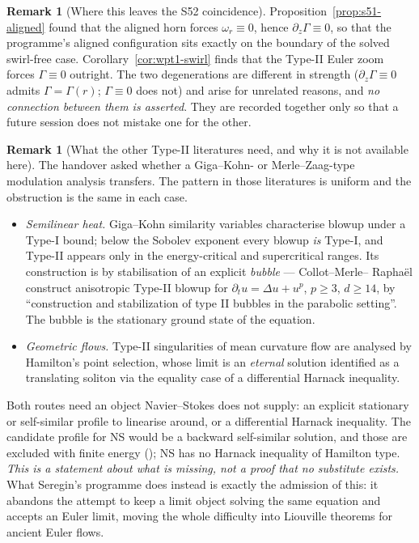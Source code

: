\documentclass[11pt]{article}
\theoremstyle{definition}
\newtheorem{remark}[theorem]{Remark}
\theoremstyle{remark}
\begin{document}
\begin{remark}[Where this leaves the S52 coincidence]
  \label{rem:wpt1-s52-coincidence}
  Proposition~\ref{prop:s51-aligned} found that the aligned horn forces
  $\omega_r\equiv0$, hence $\partial_z\Gamma\equiv0$, so that the programme's
  aligned configuration sits exactly on the boundary of the solved
  swirl-free case. Corollary~\ref{cor:wpt1-swirl} finds that the Type-II
  Euler zoom forces $\Gamma\equiv0$ outright. The two degenerations are
  different in strength ($\partial_z\Gamma\equiv0$ admits $\Gamma=\Gamma(r)$;
  $\Gamma\equiv0$ does not) and arise for unrelated reasons, and \emph{no
  connection between them is asserted}. They are recorded together only so
  that a future session does not mistake one for the other.
\end{remark}

\begin{remark}[What the other Type-II literatures need, and why it is not
  available here]\label{rem:wpt1-other-pdes}
  The handover asked whether a Giga--Kohn- or Merle--Zaag-type modulation
  analysis transfers. The pattern in those literatures is uniform and the
  obstruction is the same in each case.
  \begin{itemize}
    \item \emph{Semilinear heat.} Giga--Kohn similarity variables
      \cite{GigaKohn1987} characterise blowup under a Type-I bound; below the
      Sobolev exponent every blowup \emph{is} Type-I, and Type-II appears
      only in the energy-critical and supercritical ranges. Its construction
      is by stabilisation of an explicit \emph{bubble} --- Collot--Merle--%
      Rapha\"el \cite{CollotMerleRaphael2017} construct anisotropic Type-II
      blowup for $\partial_tu=\Delta u+u^p$, $p\geq3$, $d\geq14$, by
      ``construction and stabilization of type II bubbles in the parabolic
      setting''. The bubble is the stationary ground state of the equation.
    \item \emph{Geometric flows.} Type-II singularities of mean curvature
      flow are analysed by Hamilton's point selection, whose limit is an
      \emph{eternal} solution identified as a translating soliton via the
      equality case of a differential Harnack inequality.
  \end{itemize}
  Both routes need an object Navier--Stokes does not supply: an explicit
  stationary or self-similar profile to linearise around, or a differential
  Harnack inequality. The candidate profile for NS would be a backward
  self-similar solution, and those are excluded with finite energy
  (\cite{NecasRuzickaSverak1996}); NS has no Harnack inequality of Hamilton
  type. \emph{This is a statement about what is missing, not a proof that no
  substitute exists.} What Seregin's programme does instead is exactly the
  admission of this: it abandons the attempt to keep a limit object solving
  the same equation and accepts an Euler limit, moving the whole difficulty
  into Liouville theorems for ancient Euler flows.
\end{remark}
\end{document}
